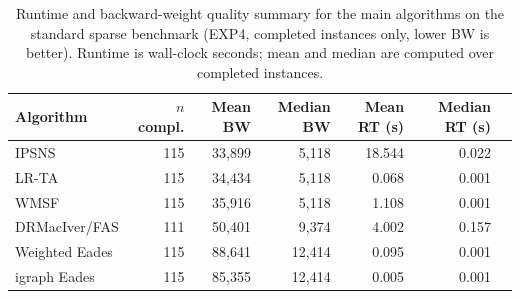 \begin{table}[htbp]
\centering
\caption{Runtime and backward-weight quality summary for the main algorithms
on the standard sparse benchmark (EXP4, completed instances only, lower BW is better).
Runtime is wall-clock seconds; mean and median are computed over completed instances.}
\label{tab:runtime_quality_tradeoff}
\small
\begin{tabular}{lrrrrrr}
\toprule
Algorithm & $n$ compl. & Mean BW & Median BW & Mean RT (s) & Median RT (s) \\
\midrule
IPSNS & 115 & 33,899 & 5,118 & 18.544 & 0.022 \\
LR-TA & 115 & 34,434 & 5,118 & 0.068 & 0.001 \\
WMSF & 115 & 35,916 & 5,118 & 1.108 & 0.001 \\
DRMacIver/FAS & 111 & 50,401 & 9,374 & 4.002 & 0.157 \\
Weighted Eades & 115 & 88,641 & 12,414 & 0.095 & 0.001 \\
igraph Eades & 115 & 85,355 & 12,414 & 0.005 & 0.001 \\
\bottomrule
\end{tabular}
\end{table}
